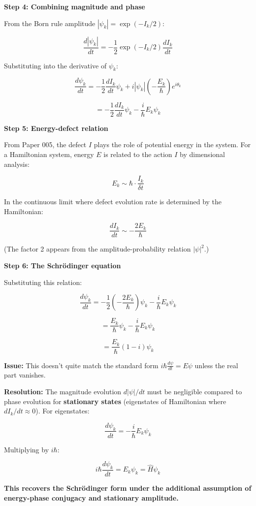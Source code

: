\documentclass[
]{article}
\begin{document}
\textbf{Step 4: Combining magnitude and phase}

From the Born rule amplitude \(|\psi_k| = \exp(-I_k/2)\):

\[\frac{d|\psi_k|}{dt} = -\frac{1}{2} \exp(-I_k/2) \frac{dI_k}{dt}\]

Substituting into the derivative of \(\psi_k\):

\[\frac{d\psi_k}{dt} = -\frac{1}{2} \frac{dI_k}{dt} \psi_k + i |\psi_k| \left(-\frac{E_k}{\hbar}\right) e^{i\theta_k}\]

\[= -\frac{1}{2} \frac{dI_k}{dt} \psi_k - \frac{i}{\hbar} E_k \psi_k\]

\textbf{Step 5: Energy-defect relation}

From Paper 005, the defect \(I\) plays the role of potential energy in
the system. For a Hamiltonian system, energy \(E\) is related to the
action \(I\) by dimensional analysis:

\[E_k \sim \hbar \cdot \frac{I_k}{\delta t}\]

In the continuous limit where defect evolution rate is determined by the
Hamiltonian:

\[\frac{dI_k}{dt} \sim -\frac{2E_k}{\hbar}\]

(The factor 2 appears from the amplitude-probability relation
\(|\psi|^2\).)

\textbf{Step 6: The Schrödinger equation}

Substituting this relation:

\[\frac{d\psi_k}{dt} = -\frac{1}{2} \left(-\frac{2E_k}{\hbar}\right) \psi_k - \frac{i}{\hbar} E_k \psi_k\]

\[= \frac{E_k}{\hbar} \psi_k - \frac{i}{\hbar} E_k \psi_k\]

\[= \frac{E_k}{\hbar} (1 - i) \psi_k\]

\textbf{Issue:} This doesn't quite match the standard form
\(i\hbar \frac{d\psi}{dt} = E\psi\) unless the real part vanishes.

\textbf{Resolution:} The magnitude evolution \(d|\psi|/dt\) must be
negligible compared to phase evolution for \textbf{stationary states}
(eigenstates of Hamiltonian where \(dI_k/dt \approx 0\)). For
eigenstates:

\[\frac{d\psi_k}{dt} = -\frac{i}{\hbar} E_k \psi_k\]

Multiplying by \(i\hbar\):

\[i\hbar \frac{d\psi_k}{dt} = E_k \psi_k = \hat{H} \psi_k\]

\textbf{This recovers the Schrödinger form under the additional
assumption of energy-phase conjugacy and stationary amplitude.}
\end{document}
